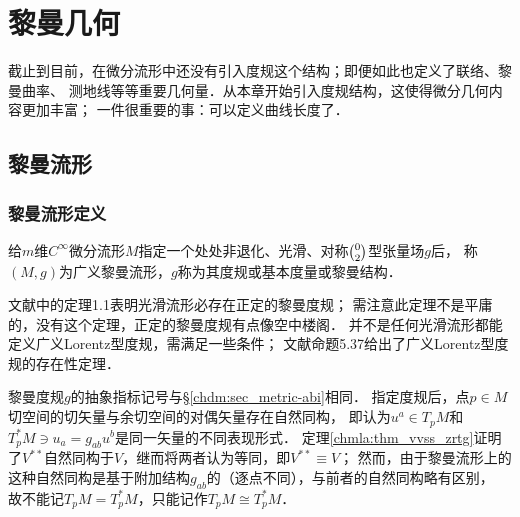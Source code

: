 
\chapter{黎曼几何}\label{chrg}



截止到目前，在微分流形中还没有引入度规这个结构；即便如此也定义了联络、黎曼曲率、
测地线等等重要几何量．从本章开始引入度规结构，这使得微分几何内容更加丰富；
一件很重要的事：可以定义曲线长度了．


\section{黎曼流形}\label{chrg:sec_riemann}

\subsection{黎曼流形定义}\label{chrg:sec_riemann-metric}
\begin{definition}
    给$m$维$C^\infty$微分流形$M$指定一个处处非退化、光滑、对称$\binom{0}{2}$型张量场$g$后，
    称$(M,g)$为广义{\heiti 黎曼流形}，$g$称为其{\heiti 度规}或{\heiti 基本度量}或{\heiti 黎曼结构}．
\end{definition}


\begin{remark}
    文献\parencite[\S 5.1]{cc2001-zh}中的定理1.1表明光滑流形必存在正定的黎曼度规；
    需注意此定理不是平庸的，没有这个定理，正定的黎曼度规有点像空中楼阁．
    并不是任何光滑流形都能定义广义Lorentz型度规，需满足一些条件；
    文献\parencite{oneill1983}命题5.37给出了广义Lorentz型度规的存在性定理．
\end{remark}

\begin{remark}
    黎曼度规$g$的抽象指标记号与\S\ref{chdm:sec_metric-abi}相同．
    指定度规后，点$p\in M$切空间的切矢量与余切空间的对偶矢量存在自然同构，
    即认为$u^a\in T_pM$和$T^*_pM \ni u_a = g_{ab}u^b$是同一矢量的不同表现形式．
    定理\ref{chmla:thm_vvss_zrtg}证明了$V^{**}$自然同构于$V$，继而将两者认为等同，即$V^{**}\equiv V$；
    然而，由于黎曼流形上的这种自然同构是基于附加结构$g_{ab}$的（逐点不同），与前者的自然同构略有区别，
    故不能记$T_pM=T^*_pM$，只能记作$T_pM\cong T^*_pM$．
\end{remark}

